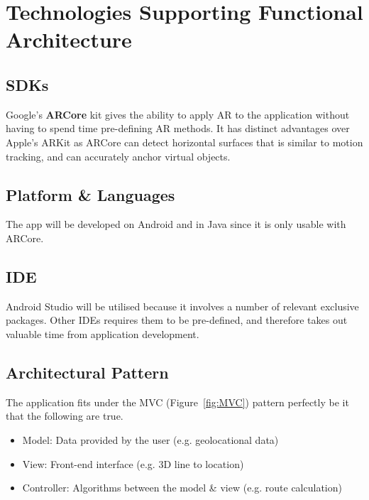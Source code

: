 
\section{Technologies Supporting Functional Architecture}

\subsection*{SDKs}
Google's \textbf{ARCore} kit gives the ability to apply AR to the application without having to spend time pre-defining AR methods. It has distinct advantages over Apple's ARKit as ARCore can detect horizontal surfaces that is similar to motion tracking, and can accurately anchor virtual objects. \cite{newgenapps}

\subsection*{Platform \& Languages}
The app will be developed on Android and in Java since it is only usable with ARCore.

\subsection*{IDE}
Android Studio will be utilised because it involves a number of relevant exclusive packages. Other IDEs requires them to be pre-defined, and therefore takes out valuable time from application development.

\subsection*{Architectural Pattern}
The application fits under the MVC (Figure~\ref{fig:MVC}) pattern perfectly be it that the following are true.
\begin{itemize}
    \item Model: Data provided by the user (e.g. geolocational data)
    \item View: Front-end interface (e.g. 3D line to location)
    \item Controller: Algorithms between the model \& view (e.g. route calculation)
\end{itemize}

